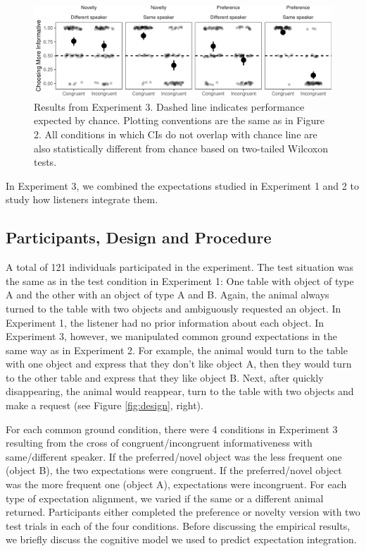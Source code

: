 \documentclass[10pt, letterpaper]{article}
\newenvironment{CodeChunk}{}{}
\begin{document}
\begin{CodeChunk}
\begin{figure}[h]

{\centering \includegraphics{figs/plotexp3-1} 

}

\caption[Results from Experiment 3]{Results from Experiment 3. Dashed line indicates performance expected by chance. Plotting conventions are the same as in Figure 2. All conditions in which CIs do not overlap with chance line are also statistically different from chance based on two-tailed Wilcoxon tests.}\label{fig:plotexp3}
\end{figure}
\end{CodeChunk}

In Experiment 3, we combined the expectations studied in Experiment 1
and 2 to study how listeners integrate them.

\subsection{Participants, Design and
Procedure}\label{participants-design-and-procedure-2}

A total of 121 individuals participated in the experiment. The test
situation was the same as in the test condition in Experiment 1: One
table with object of type A and the other with an object of type A and
B. Again, the animal always turned to the table with two objects and
ambiguously requested an object. In Experiment 1, the listener had no
prior information about each object. In Experiment 3, however, we
manipulated common ground expectations in the same way as in Experiment
2. For example, the animal would turn to the table with one object and
express that they don't like object A, then they would turn to the other
table and express that they like object B. Next, after quickly
disappearing, the animal would reappear, turn to the table with two
objects and make a request (see Figure \ref{fig:design}, right).

For each common ground condition, there were 4 conditions in Experiment
3 resulting from the cross of congruent/incongruent informativeness with
same/different speaker. If the preferred/novel object was the less
frequent one (object B), the two expectations were congruent. If the
preferred/novel object was the more frequent one (object A),
expectations were incongruent. For each type of expectation alignment,
we varied if the same or a different animal returned. Participants
either completed the preference or novelty version with two test trials
in each of the four conditions. Before discussing the empirical results,
we briefly discuss the cognitive model we used to predict expectation
integration.
\end{document}
